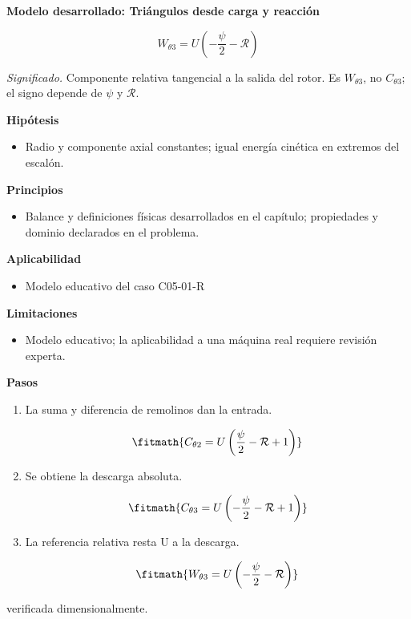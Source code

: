 \documentclass[10pt,openany]{book}
\begin{document}
\begin{tcolorbox}[title={Desarrollos del modelo}, studiumdef, breakable]

\noindent\textbf{Modelo desarrollado: Triángulos desde carga y reacción}

\begin{equation}
W_{\theta 3}=U\left(-\frac{\psi}{2}-\mathcal R\right)
\label{eq:EC-C05}
\end{equation}

\noindent\textit{Significado.} Componente relativa tangencial a la salida del rotor. Es $W_{\theta 3}$, no $C_{\theta 3}$; el signo depende de $\psi$ y $\mathcal R$.

\noindent\textbf{Hipótesis}
\begin{itemize}
\item Radio y componente axial constantes; igual energía cinética en extremos del escalón.
\end{itemize}

\noindent\textbf{Principios}
\begin{itemize}
\item Balance y definiciones físicas desarrollados en el capítulo; propiedades y dominio declarados en el problema.
\end{itemize}

\noindent\textbf{Aplicabilidad}
\begin{itemize}
\item Modelo educativo del caso C05-01-R
\end{itemize}

\noindent\textbf{Limitaciones}
\begin{itemize}
\item Modelo educativo; la aplicabilidad a una máquina real requiere revisión experta.
\end{itemize}

\noindent\textbf{Pasos}
\begin{enumerate}
\item
La suma y diferencia de remolinos dan la entrada.

\[
\fitmath{C_{\theta2}=U \left(\frac{\psi}{2} - \mathcal R + 1\right)}
\]
\item
Se obtiene la descarga absoluta.

\[
\fitmath{C_{\theta3}=U \left(- \frac{\psi}{2} - \mathcal R + 1\right)}
\]
\item
La referencia relativa resta U a la descarga.

\[
\fitmath{W_{\theta 3}=U \left(- \frac{\psi}{2} - \mathcal R\right)}
\]
\end{enumerate}

{\noindent\footnotesize verificada dimensionalmente.\par}
\end{tcolorbox}
\end{document}
